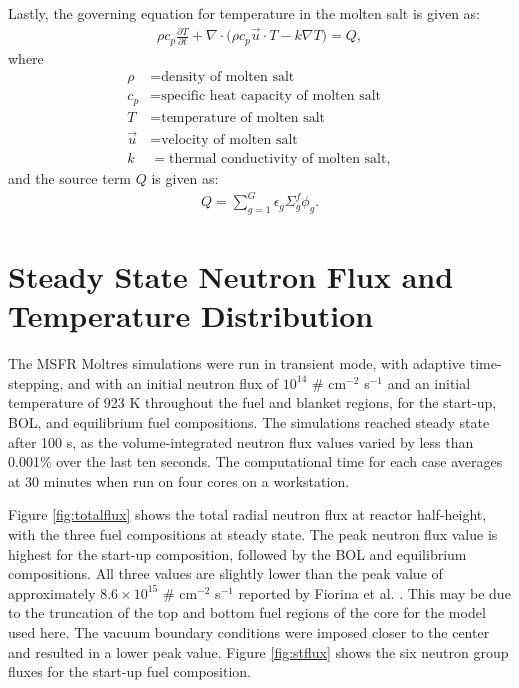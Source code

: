 \documentclass{anstrans}
\begin{document}
	Lastly, the governing equation for temperature in the molten salt is given
	as:
%
\begin{align}
	\rho c_{p} \frac{\partial T}{\partial t} + \nabla \cdot \big( \rho
	c_{p} \overrightarrow{u} \cdot T - k \nabla T \big) = Q,
	\label{eq3}
\end{align}
%
	where
{\small
\begin{align}
	\rho &= \text{density of molten salt} \\
	 c_{p} &= \text{specific heat capacity of molten salt} \\
	 T &= \text{temperature of molten salt} \\
	 \overrightarrow{u} &= \text{velocity of molten salt} \\
	 k &= \text{thermal conductivity of molten salt},
\end{align}
}
	and the source term $Q$ is given as:
%
\begin{align}
Q = \sum^G_{g=1} \epsilon_g \Sigma_g^f \phi_g. \label{eq4}
\end{align}

\section{Steady State Neutron Flux and Temperature Distribution}

	The \gls{MSFR} Moltres simulations were run in transient mode, with
	adaptive time-stepping, and with an
	initial neutron flux of $10^{14}$
	\# cm$^{-2}$ s$^{-1}$ and an initial temperature of 923 K throughout the
	fuel and blanket regions, for the start-up, \gls{BOL}, and equilibrium
	fuel compositions. The simulations reached steady state after 100 s, as the
	volume-integrated neutron flux values varied by less than 0.001\% over the
	last ten seconds. The computational time for each case averages at 30
	minutes when run on four cores on a workstation.
	
	Figure \ref{fig:totalflux} shows the total radial neutron flux at reactor
	half-height, with the three fuel compositions at steady state. 
	The peak neutron flux value is highest for the start-up composition,
	followed by the \gls{BOL} and equilibrium compositions. All three values
	are slightly lower than the peak value of approximately
	$8.6 \times 10^{15}$ \# cm$^{-2}$ s$^{-1}$ reported by Fiorina et al.
	\cite{fiorina_investigation_2013}. This may be due to the truncation of
	the top and bottom fuel regions of the core for the model used here.
	The vacuum boundary conditions were imposed closer to the center and
	resulted in a lower peak value. Figure \ref{fig:stflux} shows the six
	neutron group fluxes for the start-up fuel composition.
	
\end{document}
